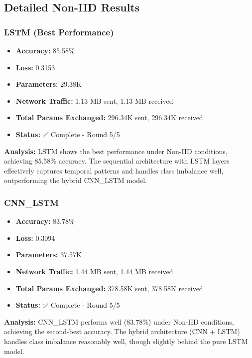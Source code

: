 \documentclass[12pt,a4paper]{article}
\begin{document}
\subsection{Detailed Non-IID Results}

\subsubsection{LSTM (Best Performance)}

\begin{itemize}
    \item \textbf{Accuracy:} 85.58\%
    \item \textbf{Loss:} 0.3153
    \item \textbf{Parameters:} 29.38K
    \item \textbf{Network Traffic:} 1.13 MB sent, 1.13 MB received
    \item \textbf{Total Params Exchanged:} 296.34K sent, 296.34K received
    \item \textbf{Status:} ✅ Complete - Round 5/5
\end{itemize}

\textbf{Analysis:} LSTM shows the best performance under Non-IID conditions, achieving 85.58\% accuracy. The sequential architecture with LSTM layers effectively captures temporal patterns and handles class imbalance well, outperforming the hybrid CNN\_LSTM model.

\subsubsection{CNN\_LSTM}

\begin{itemize}
    \item \textbf{Accuracy:} 83.78\%
    \item \textbf{Loss:} 0.3094
    \item \textbf{Parameters:} 37.57K
    \item \textbf{Network Traffic:} 1.44 MB sent, 1.44 MB received
    \item \textbf{Total Params Exchanged:} 378.58K sent, 378.58K received
    \item \textbf{Status:} ✅ Complete - Round 5/5
\end{itemize}

\textbf{Analysis:} CNN\_LSTM performs well (83.78\%) under Non-IID conditions, achieving the second-best accuracy. The hybrid architecture (CNN + LSTM) handles class imbalance reasonably well, though slightly behind the pure LSTM model.
\end{document}
